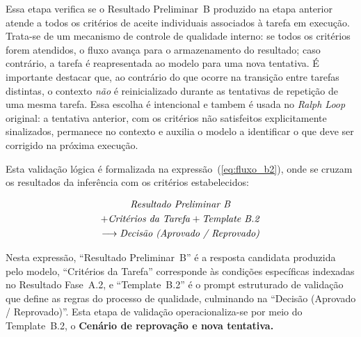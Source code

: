 \documentclass[a4paper,10pt,twocolumn]{article}
\begin{document}
Essa etapa verifica se o Resultado Preliminar~B produzido na etapa anterior atende a todos os critérios de aceite individuais associados à tarefa em execução. Trata-se de um mecanismo de controle de qualidade interno: se todos os critérios forem atendidos, o fluxo avança para o armazenamento do resultado; caso contrário, a tarefa é reapresentada ao modelo para uma nova tentativa. É importante destacar que, ao contrário do que ocorre na transição entre tarefas distintas, o contexto \emph{não} é reinicializado durante as tentativas de repetição de uma mesma tarefa. Essa escolha é intencional e tambem é usada no \textit{Ralph Loop} original: a tentativa anterior, com os critérios não satisfeitos explicitamente sinalizados, permanece no contexto e auxilia o modelo a identificar o que deve ser corrigido na próxima execução.

Esta validação lógica é formalizada na expressão~(\ref{eq:fluxo_b2}), onde se cruzam os resultados da inferência com os critérios estabelecidos:

\begin{multline} \label{eq:fluxo_b2}
\text{\textit{Resultado Preliminar B}} \\
+ \text{\textit{Critérios da Tarefa}} + \text{\textit{Template B.2}} \\
\longrightarrow \text{\textit{Decisão (Aprovado / Reprovado)}}
\end{multline}

Nesta expressão, ``Resultado Preliminar~B'' é a resposta candidata produzida pelo modelo, ``Critérios da Tarefa'' corresponde às condições específicas indexadas no Resultado Fase~A.2, e ``Template~B.2'' é o prompt estruturado de validação que define as regras do processo de qualidade, culminando na ``Decisão (Aprovado / Reprovado)''. Esta etapa de validação operacionaliza-se por meio do Template~B.2, o \textbf{Cenário de reprovação e nova tentativa.}
\end{document}
